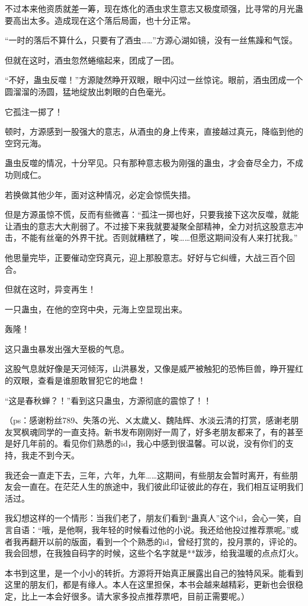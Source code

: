 \begin{this_body}
不过本来他资质就差一筹，现在炼化的酒虫求生意志又极度顽强，比寻常的月光蛊要高出太多。造成现在这个落后局面，也十分正常。

“一时的落后不算什么，只要有了酒虫……”方源心湖如镜，没有一丝焦躁和气馁。

但就在这时，酒虫忽然蜷缩起来，团成了一团。

“不好，蛊虫反噬！”方源陡然睁开双眼，眼中闪过一丝惊诧。眼前，酒虫团成一个圆溜溜的汤圆，猛地绽放出刺眼的白色毫光。

它孤注一掷了！

顿时，方源感到一股强大的意志，从酒虫的身上传来，直接越过真元，降临到他的空窍元海。

蛊虫反噬的情况，十分罕见。只有那种意志极为刚强的蛊虫，才会奋尽全力，不成功则成仁。

若换做其他少年，面对这种情况，必定会惊慌失措。

但是方源虽惊不慌，反而有些微喜：“孤注一掷也好，只要我接下这次反噬，就能让酒虫的意志大大削弱了。不过接下来我就要凝聚全部精神，全力对抗这股意志冲击，不能有丝毫的外界干扰。否则就糟糕了，唉……但愿这期间没有人来打扰我。”

他思量完毕，正要催动空窍真元，迎上那股意志。好好与它纠缠，大战三百个回合。

但就在这时，异变再生！

一只蛊虫，在他的空窍中央，元海上空显现出来。

轰隆！

这只蛊虫暴发出强大至极的气息。

这股气息就好像是天河倾泻，山洪暴发，又像是威严被触犯的恐怖巨兽，睁开猩红的双眼，查看是谁胆敢冒犯它的地盘！

“这是春秋蝉？！”看到这只蛊虫，方源彻底的震惊了！！

（ps：感谢粉丝789、失落の光、ㄨ太歲乂、魏陆辉、水淡云清的打赏，感谢老朋友冥枫魂同学的一直支持。新书发布刚刚好一周了，好多老朋友都来了，有的甚至是好几年前的。看见你们熟悉的id，我心中感到很温馨。可以说，没有你们的支持，我走不到今天。

我还会一直走下去，三年，六年，九年……这期间，有些朋友会暂时离开，有些朋友会一直在。在茫茫人生的旅途中，我们彼此印证彼此的存在，我们相互证明我们活过。

我幻想这样的一个情形：当我们老了，朋友们看到“蛊真人”这个id，会心一笑，自言自语：“哦，是他啊，我年轻的时候看过他的小说。我还给他投过推荐票呢。”或者我再翻开以前的版面，看到一个个熟悉的id，曾经打赏的，投月票的，评论的。我会回想，在我独自码字的时候，这些个名字就是**跋涉，给我温暖的点点灯火。

本书到这里，是一个小小的转折。方源将开始真正展露出自己的独特风采。能看到这里的朋友们，都是有缘人。本人在这里担保，本书会越来越精彩，更新也会很稳定，比上一本会好很多。请大家多投点推荐票吧，目前正需要呢。）

\end{this_body}

